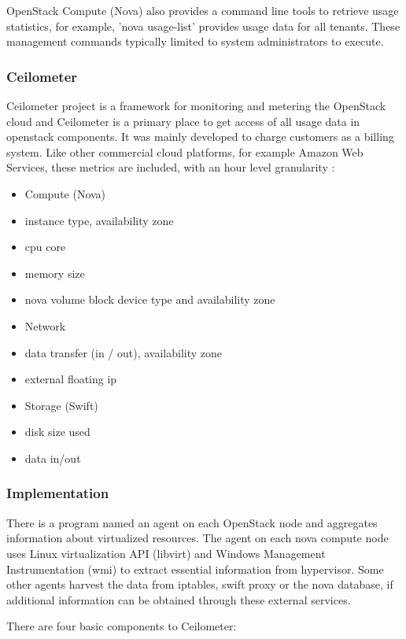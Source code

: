 \documentclass{sig-alternate}
\begin{document}
OpenStack Compute (Nova) also provides a command line tools to retrieve usage statistics, for example, 'nova usage-list' provides usage data for all tenants. These management commands typically limited to system administrators to execute.

\subsubsection{Ceilometer}

Ceilometer project is a framework for monitoring and metering the OpenStack cloud and Ceilometer is a primary place to get access of all usage data in openstack components. It was mainly developed to charge customers as a billing system. Like other commercial cloud platforms, for example Amazon Web Services, these metrics are included, with an hour level granularity :

\begin{itemize}
  \item Compute (Nova)
  \item instance type, availability zone
  \item cpu core
  \item memory size
  \item nova volume block device type and availability zone
  \item Network
  \item data transfer (in / out), availability zone
  \item external floating ip
  \item Storage (Swift)
  \item disk size used
  \item data in/out
\end{itemize}

\subsubsection{Implementation}

There is a program named an agent on each OpenStack node and aggregates information about virtualized resources. The agent on each nova compute node uses Linux virtualization API (libvirt) and Windows Management Instrumentation (wmi) to extract essential information from hypervisor. Some other agents harvest the data from iptables, swift proxy or the nova database, if additional information can be obtained through these external services.

There are four basic components to Ceilometer:
\end{document}
